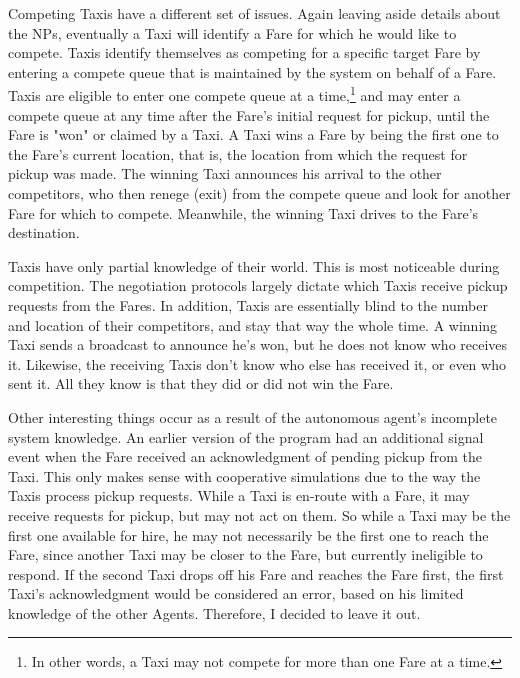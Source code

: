 \documentclass[11pt,letterpaper,onecolumn,twoside,openright,draft]{report}
\begin{document}
Competing Taxis have a different set of issues.
Again leaving aside details about the NPs, eventually a Taxi will identify a Fare for which he would like to compete.
Taxis identify themselves as competing for a specific target Fare by entering a compete queue that is maintained by the system on behalf of a Fare.
Taxis are eligible to enter one compete queue at a time,\footnote{In other words, a Taxi may not compete for more than one Fare at a time.} and may enter a compete queue at any time after the Fare's initial request for pickup, until the Fare is "won" or claimed by a Taxi.
A Taxi wins a Fare by being the first one to the Fare's current location, that is, the location from which the request for pickup was made.
The winning Taxi announces his arrival to the other competitors, who then renege (exit) from the compete queue and look for another Fare for which to compete.
Meanwhile, the winning Taxi drives to the Fare's destination.

Taxis have only partial knowledge of their world.
This is most noticeable during competition.
The negotiation protocols largely dictate which Taxis receive pickup requests from the Fares.
In addition, Taxis are essentially blind to the number and location of their competitors, and stay that way the whole time.
A winning Taxi sends a broadcast to announce he's won, but he does not know who receives it.
Likewise, the receiving Taxis don't know who else has received it, or even who sent it.
All they know is that they did or did not win the Fare.

Other interesting things occur as a result of the autonomous agent's incomplete system knowledge.
An earlier version of the program had an additional signal event when the Fare received an acknowledgment of pending pickup from the Taxi.
This only makes sense with cooperative simulations due to the way the Taxis process pickup requests.
While a Taxi is en-route with a Fare, it may receive requests for pickup, but may not act on them.
So while a Taxi may be the first one available for hire, he may not necessarily be the first one to reach the Fare, since another Taxi may be closer to the Fare, but currently ineligible to respond.
If the second Taxi drops off his Fare and reaches the Fare first, the first Taxi's acknowledgment would be considered an error, based on his limited knowledge of the other Agents.
Therefore, I decided to leave it out.
\end{document}
